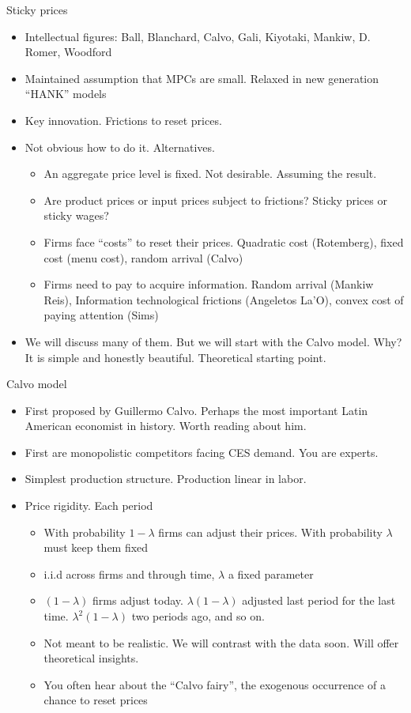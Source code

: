 \documentclass[11pt,aspectratio=169,xcolor={dvipsnames},hyperref={pdftex,pdfpagemode=UseNone,hidelinks,pdfdisplaydoctitle=true},usepdftitle=false]{beamer}
\begin{document}
\begin{frame}{Sticky prices}
\begin{itemize}
\item Intellectual figures: Ball, Blanchard, Calvo, Gali, Kiyotaki, Mankiw, D. Romer, Woodford
\pause
\item Maintained assumption that MPCs are small. Relaxed in new generation ``HANK'' models
\pause
\item Key innovation. Frictions to reset prices.
\pause
\item Not obvious how to do it. Alternatives.
\pause
\begin{itemize}
\item An aggregate price level is fixed. Not desirable. Assuming the result.
\pause
\item Are product prices or input prices subject to frictions? Sticky prices or sticky wages?
\pause
\item Firms face ``costs'' to reset their prices. Quadratic cost (Rotemberg), fixed cost (menu cost), random arrival (Calvo)
\pause
\item Firms need to pay to acquire information. Random arrival (Mankiw Reis), Information technological frictions (Angeletos La'O), convex cost of paying attention (Sims)
\end{itemize}
\pause
\item We will discuss many of them. But we will start with the Calvo model. Why? It is simple and honestly beautiful. Theoretical starting point.
\end{itemize}
\end{frame}

\begin{frame}{Calvo model}
\begin{itemize}
\item First proposed by Guillermo Calvo. Perhaps the most important Latin American economist in history. Worth reading about him. \pause
\item First are monopolistic competitors facing CES demand. You are experts.
\pause
\item Simplest production structure. Production linear in labor.
\pause
\item Price rigidity. Each period
\begin{itemize}
\item With probability $1-\lambda$ firms can adjust their prices. With probability $\lambda$ must keep them fixed
\pause
\item i.i.d across firms and through time, $\lambda$ a fixed parameter
\pause
\item $(1-\lambda)$ firms adjust today. $\lambda(1-\lambda)$ adjusted last period for the last time. $\lambda^2(1-\lambda)$ two periods ago, and so on.
\pause
\item Not meant to be realistic. We will contrast with the data soon. Will offer theoretical insights.
\pause
\item You often hear about the ``Calvo fairy'', the exogenous occurrence of a chance to reset prices
\end{itemize}
\end{itemize}
\end{frame}
\end{document}
